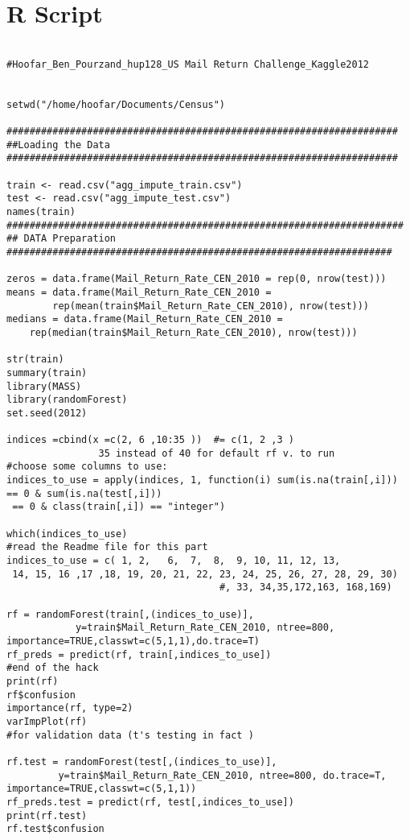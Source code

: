 \documentclass[journal]{/home/hoofar/LatexClasses/IEEEtran}
\begin{document}
\section{R Script}
\begin{verbatim}
 
#Hoofar_Ben_Pourzand_hup128_US Mail Return Challenge_Kaggle2012


setwd("/home/hoofar/Documents/Census")
 
####################################################################
##Loading the Data
####################################################################

train <- read.csv("agg_impute_train.csv")
test <- read.csv("agg_impute_test.csv")
names(train)
#####################################################################
## DATA Preparation
###################################################################

zeros = data.frame(Mail_Return_Rate_CEN_2010 = rep(0, nrow(test)))
means = data.frame(Mail_Return_Rate_CEN_2010 = 
		rep(mean(train$Mail_Return_Rate_CEN_2010), nrow(test)))
medians = data.frame(Mail_Return_Rate_CEN_2010 =
	rep(median(train$Mail_Return_Rate_CEN_2010), nrow(test)))

str(train)
summary(train)
library(MASS)
library(randomForest)
set.seed(2012)

indices =cbind(x =c(2, 6 ,10:35 ))  #= c(1, 2 ,3 ) 
				35 instead of 40 for default rf v. to run
#choose some columns to use:
indices_to_use = apply(indices, 1, function(i) sum(is.na(train[,i])) == 0 & sum(is.na(test[,i]))
 == 0 & class(train[,i]) == "integer")

which(indices_to_use)
#read the Readme file for this part
indices_to_use = c( 1, 2,   6,  7,  8,  9, 10, 11, 12, 13,
 14, 15, 16 ,17 ,18, 19, 20, 21, 22, 23, 24, 25, 26, 27, 28, 29, 30)
 									 #, 33, 34,35,172,163, 168,169)

rf = randomForest(train[,(indices_to_use)], 
			y=train$Mail_Return_Rate_CEN_2010, ntree=800, 					importance=TRUE,classwt=c(5,1,1),do.trace=T)
rf_preds = predict(rf, train[,indices_to_use])
#end of the hack
print(rf)
rf$confusion
importance(rf, type=2)
varImpPlot(rf)
#for validation data (t's testing in fact )

rf.test = randomForest(test[,(indices_to_use)],
		 y=train$Mail_Return_Rate_CEN_2010, ntree=800, do.trace=T, importance=TRUE,classwt=c(5,1,1))
rf_preds.test = predict(rf, test[,indices_to_use])
print(rf.test)
rf.test$confusion

\end{verbatim}
\end{document}
